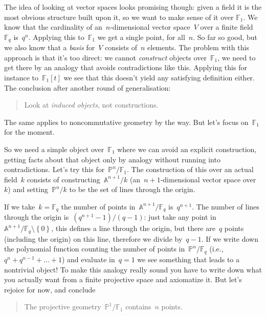 The idea of looking at vector spaces looks promising though: given a field it is the most obvious structure built upon it, so we want to make sense of it over $\mathbb{F}_1$. We know that the cardinality of an~$n$\nobreakdash-dimensional vector space~$V$ over a finite field~$\mathbb{F}_q$ is~$q^n$. Applying this to~$\mathbb{F}_1$ we get a single point, for all~$n$. So far so good, but we also know that a \emph{basis} for~$V$ consists of~$n$ elements. The problem with this approach is that it's too direct: we cannot \emph{construct} objects over~$\mathbb{F}_1$, we need to get there by an analogy that avoids contradictions like this. Applying this for instance to~$\mathbb{F}_1[t]$ we see that this doesn't yield any satisfying definition either. The conclusion after another round of generalisation:

\begin{quote}
  Look at \emph{induced objects}, not constructions.
\end{quote}

The same applies to noncommutative geometry by the way. But let's focus on~$\mathbb{F}_1$ for the moment.

So we need a simple object over~$\mathbb{F}_1$ where we can avoid an explicit construction, getting facts about that object only by analogy without running into contradictions. Let's try this for~$\mathbb{P}^n/\mathbb{F}_1$. The construction of this over an actual field~$k$ consists of constructing~$\mathbb{A}^{n+1}/k$ (an~$n+1$\nobreakdash-dimensional vector space over~$k$) and setting~$\mathbb{P}^n/k$ to be the set of lines through the origin.

If we take~$k=\mathbb{F}_q$ the number of points in~$\mathbb{A}^{n+1}/\mathbb{F}_q$ is~$q^{n+1}$. The number of lines through the origin is~$(q^{n+1}-1)/(q-1)$: just take any point in~$\mathbb{A}^{n+1}/\mathbb{F}_q\setminus\left\{ 0 \right\}$, this defines a line through the origin, but there are~$q$ points (including the origin) on this line, therefore we divide by~$q-1$. If we write down the polynomial function counting the number of points in~$\mathbb{P}^n/\mathbb{F}_q$ (i.e.,~$q^n+q^{n-1}+\ldots+1$) and evaluate in~$q=1$ we see something that leads to a nontrivial object! To make this analogy really sound you have to write down what you actually want from a finite projective space and axiomatize it. But let's rejoice for now, and conclude

\begin{quote}
  The projective geometry~$\mathbb{P}^1/\mathbb{F}_1$ contains~$n$ points.
\end{quote}

